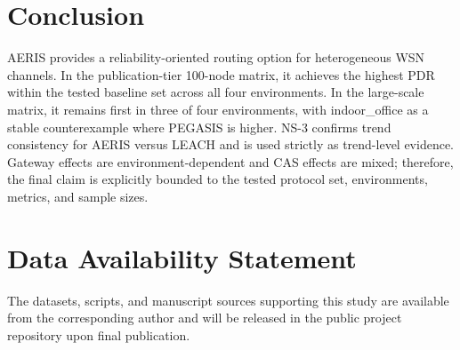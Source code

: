 ﻿\documentclass[sensors,article,submit,moreauthors,pdftex]{Definitions/mdpi}
\begin{document}
\section{Conclusion}
AERIS provides a reliability-oriented routing option for heterogeneous WSN channels. In the publication-tier 100-node matrix, it achieves the highest PDR within the tested baseline set across all four environments. In the large-scale matrix, it remains first in three of four environments, with indoor\_office as a stable counterexample where PEGASIS is higher. NS-3 confirms trend consistency for AERIS versus LEACH and is used strictly as trend-level evidence. Gateway effects are environment-dependent and CAS effects are mixed; therefore, the final claim is explicitly bounded to the tested protocol set, environments, metrics, and sample sizes.

\section*{Data Availability Statement}
The datasets, scripts, and manuscript sources supporting this study are available from the corresponding author and will be released in the public project repository upon final publication.


\end{document}

